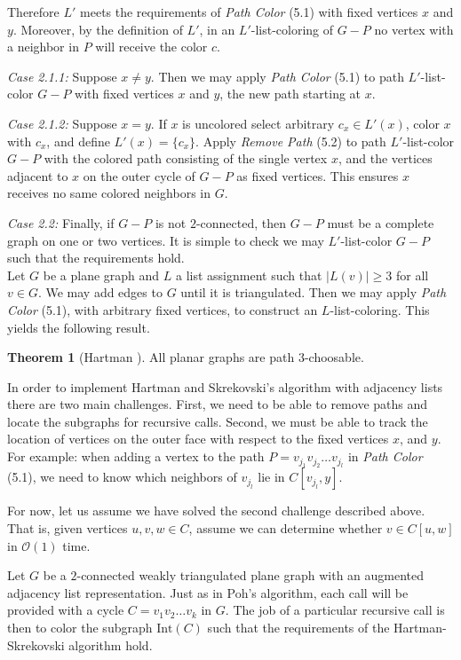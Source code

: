 \documentclass[letterpaper, 12pt]{article}
\theoremstyle{definition}
\theoremstyle{definition}
\theoremstyle{thm}
\newtheorem{theorem}{Theorem}[section]
\theoremstyle{definition}
\begin{document}
Therefore $L'$ meets the requirements of \textit{Path Color}
(5.1) with fixed vertices $x$ and $y$. Moreover, by the definition of $L'$, in
an $L'$-list-coloring of $G-P$ no vertex with a neighbor in $P$ will receive the
color $c$.

\textit{Case 2.1.1:} Suppose $x\ne y$. Then we may apply \textit{Path Color}
(5.1) to path $L'$-list-color $G-P$ with fixed vertices $x$ and $y$, the new
path starting at $x$.

\textit{Case 2.1.2:} Suppose $x=y$. If $x$ is uncolored select arbitrary
$c_x\in L'(x)$, color $x$ with $c_x$, and define $L'(x)=\{c_x\}$. Apply
\textit{Remove Path} (5.2) to path $L'$-list-color $G-P$
with the colored path consisting of the single vertex $x$, and the vertices
adjacent to $x$ on the outer cycle of $G-P$ as fixed vertices. This ensures $x$
receives no same colored neighbors in $G$.

\textit{Case 2.2:} Finally, if $G-P$ is not $2$-connected, then $G-P$ must be a
complete graph on one or two vertices. It is simple to check we may
$L'$-list-color $G-P$ such that the requirements hold.\\

Let $G$ be a plane graph and $L$ a list assignment such that $|L(v)|\ge 3$
for all $v\in G$. We may add edges to $G$ until it is triangulated. Then
we may apply \textit{Path Color} (5.1), with arbitrary fixed vertices, to
construct an $L$-list-coloring. This yields the following result.

\begin{theorem}[Hartman \cite{hartman}]
All planar graphs are path $3$-choosable.
\end{theorem}

In order to implement Hartman and Skrekovski's algorithm with adjacency lists
there are two main challenges. First, we need to be able to remove paths and
locate the subgraphs for recursive calls. Second, we must be able to track the
location of vertices on the outer face with respect to the fixed vertices
$x$, and $y$. For example: when adding a vertex to the path
$P=v_{j_1}v_{j_2}\ldots v_{j_l}$ in \textit{Path Color} (5.1), we need to know
which neighbors of $v_{j_l}$ lie in $C[v_{j_l},y]$.

For now, let us assume we have solved the second challenge described above. That
is, given vertices $u,v,w\in C$, assume we can determine whether $v\in C[u,w]$
in $\mathcal{O}(1)$ time.

Let $G$ be a $2$-connected weakly triangulated plane graph with an augmented
adjacency list representation. Just as in Poh's algorithm, each call will be
provided with a cycle $C=v_1v_2\ldots v_k$ in $G$. The
job of a particular recursive call is then to color the subgraph $\text{Int}(C)$
such that the requirements of the Hartman-Skrekovski algorithm hold.
\end{document}
